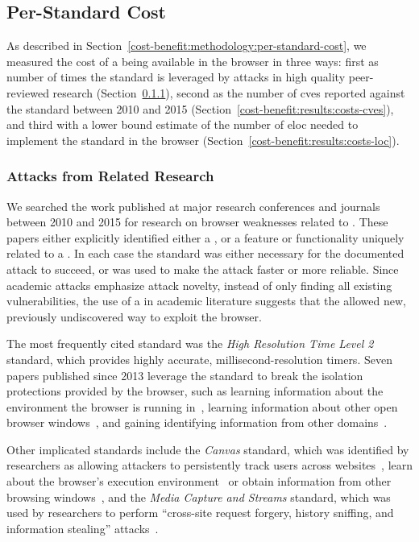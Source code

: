 \subsection{Per-Standard Cost}
\label{cost-benefit:results:results-costs}
As described in Section~\ref{cost-benefit:methodology:per-standard-cost}, we
measured the cost of a \WAS being available in the browser in three ways: first
as number of times the standard is leveraged by attacks in high quality
peer-reviewed research (Section~\ref{cost-benefit:results:costs-research}),
second as the number of \gls{cve}s reported against the standard between 2010
and 2015 (Section~\ref{cost-benefit:results:costs-cves}), and third with a
lower bound estimate of the number of \gls{eloc} needed to implement the
standard in the browser (Section~\ref{cost-benefit:results:costs-loc}).


\subsubsection{Attacks from Related Research}
\label{cost-benefit:results:costs-research}

We searched the work published at major research conferences and journals
between 2010 and 2015 for research on browser weaknesses related to \WASs.
These papers either explicitly identified either a \WAS, or a feature or
functionality uniquely related to a \WAS.  In each case the standard was either
necessary for the documented attack to succeed, or was used to make the attack
faster or more reliable.  Since academic attacks emphasize attack novelty,
instead of only finding all existing vulnerabilities, the use of a \WAS in
academic literature suggests that the \WAS allowed new, previously undiscovered
way to exploit the browser.

The most frequently cited standard was the \textit{High Resolution Time Level
2}~\cite{highres2016w3c} standard, which provides highly accurate,
millisecond-resolution timers.  Seven papers published since 2013 leverage the
standard to break the isolation protections provided by the browser, such as
learning information about the environment the browser is running
in~\cite{ho2014tick,oren2015spy,gruss2015practical}, learning information about
other open browser
windows~\cite{andrysco2015subnormal,kotcher2013cross,gruss2015practical}, and
gaining identifying information from other domains~\cite{van2015clock}.

Other implicated standards include the \textit{Canvas} standard, which was
identified by researchers as allowing attackers to persistently track users
across websites~\cite{acar2014web}, learn about the browser's execution
environment~\cite{ho2014tick} or obtain information from other browsing
windows~\cite{kotcher2013cross}, and the \textit{Media Capture and Streams}
standard, which was used by researchers to perform ``cross-site request
forgery, history sniffing, and information stealing''
attacks~\cite{tian2014all}.

